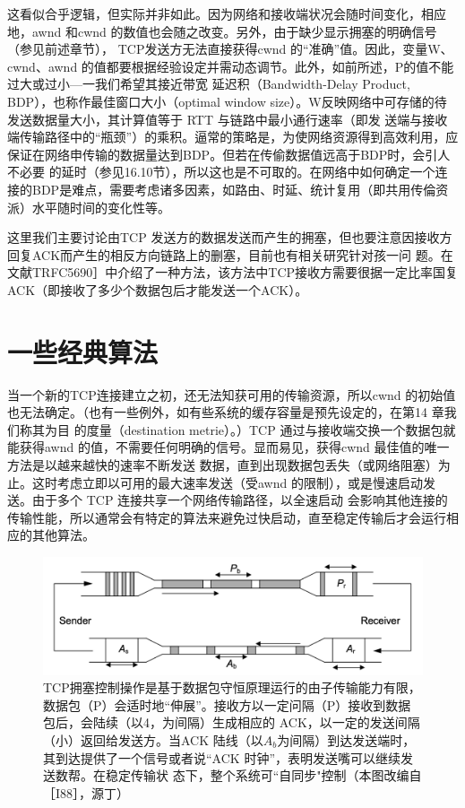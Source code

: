 这看似合乎逻辑，但实际并非如此。因为网络和接收端状况会随时间变化，相应地，awnd 和cwnd 的数值也会随之改变。另外，由于缺少显示拥塞的明确信号（参见前述章节），
TCP发送方无法直接获得cwnd 的“准确”值。因此，变量W、cwnd、awnd 的值都要根据经验设定并需动态调节。此外，如前所述，P的值不能过大或过小—一我们希望其接近带宽
延迟积（Bandwidth-Delay Product, BDP），也称作最佳窗口大小（optimal window size）。W反映网络中可存储的待发送数据量大小，其计算值等于 RTT 与链路中最小通行速率（即发
送端与接收端传输路径中的“瓶颈”）的乘积。逼常的策略是，为使网络资源得到高效利用，应保证在网络申传输的数据量达到BDP。但若在传偷数据值远高于BDP时，会引人不必要
的延时（参见16.10节），所以这也是不可取的。在网络中如何确定一个连接的BDP是难点，需要考虑诸多因素，如路由、时延、统计复用（即共用传倫资派）水平随时间的变化性等。

\begin{tcolorbox}
    这里我们主要讨论由TCP 发送方的数据发送而产生的拥塞，但也要注意因接收方回复ACK而产生的相反方向链路上的删塞，目前也有相关研究针对孩一问
    题。在文献TRFC5690］中介绍了一种方法，该方法中TCP接收方需要很据一定比率国复ACK（即接收了多少个数据包后才能发送一个ACK）。
\end{tcolorbox}

\section{一些经典算法}
当一个新的TCP连接建立之初，还无法知获可用的传输资源，所以cwnd 的初始值也无法确定。（也有一些例外，如有些系统的缓存容量是预先设定的，在第14 章我们称其为目
的度量（destination metrie）。）TCP 通过与接收端交换一个数据包就能获得awnd 的值，不需要任何明确的信号。显而易见，获得cwnd 最佳值的唯一方法是以越来越快的速率不断发送
数据，直到出现数据包丢失（或网络阻塞）为止。这时考虑立即以可用的最大速率发送（受awnd 的限制），或是慢速启动发送。由于多个 TCP 连接共享一个网络传输路径，以全速启动
会影响其他连接的传输性能，所以通常会有特定的算法来避免过快启动，直至稳定传输后才会运行相应的其他算法。

\begin{figure}[!htb]
    \centering
	\includegraphics[width=1\textwidth]{imgs/16/16-1.png}
	\caption{TCP拥塞控制操作是基于数据包守恒原理运行的由子传输能力有限，数据包（P）会适时地“伸展”。接收方以一定问隔（P）接收到数据包后，会陆续（以4，为间隔）生成相应的
    ACK，以一定的发送间隔（小）返回给发送方。当ACK 陆线（以$A_{b}$为间隔）到达发送端时，其到达提供了一个信号或者说“ACK 时钟”，表明发送嘴可以继续发送数帮。在稳定传输状
    态下，整个系统可“自同步"控制（本图改编自 ［I88］，源丁）}
    \label{fig:16-1}
\end{figure}


